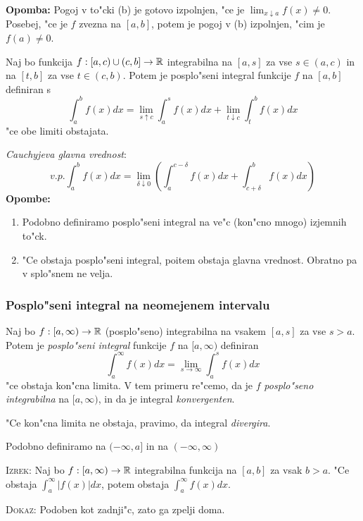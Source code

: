 \textbf{Opomba:} Pogoj v to"cki (b) je gotovo izpolnjen, "ce je $\lim_{x \downarrow a} f(x) \neq 0$. Posebej, "ce je $f$ zvezna na $[a, b]$, potem je pogoj v (b) izpolnjen, "cim je $f(a) \neq 0$.

 Naj bo funkcija $f: [a, c) \cup (c, b] \to \mathbb{R}$ integrabilna na $[a, s]$ za vse $s \in (a, c)$ in na $[t, b]$ za vse $t \in (c, b)$. Potem je posplo"seni integral funkcije $f$ na $[a, b]$ definiran s
\begin{equation*}
\int_a^b f(x) dx = \lim_{s \uparrow c} \int_a^s f(x) dx + \lim_{t \downarrow c} \int_t^b f(x) dx
\end{equation*}
"ce obe limiti obstajata.

\emph{Cauchyjeva glavna vrednost}:
\begin{equation*}
v.p. \int_a^b f(x) dx = \lim_{\delta \downarrow 0} \left( \int_a^{c - \delta} f(x) dx + \int_{c + \delta}^b f(x) dx\right)
\end{equation*}
\textbf{Opombe:}
\begin{enumerate}
	\item Podobno definiramo posplo"seni integral na ve"c (kon"cno mnogo) izjemnih to"ck.
	\item "Ce obstaja posplo"seni integral, poitem obstaja glavna vrednost. Obratno pa v splo"snem ne velja.
\end{enumerate}
%
\subsubsection{Posplo"seni integral na neomejenem intervalu}
 Naj bo $f: [a, \infty) \to \mathbb{R}$ (posplo"seno) integrabilna na vsakem $[a, s]$ za vse $s > a$. Potem je \emph{posplo"seni integral} funkcije $f$ na $[a, \infty)$ definiran
\begin{equation*}
\int_a^\infty f(x) dx = \lim_{s \to \infty} \int_a^s f(x) dx
\end{equation*}
"ce obstaja kon"cna limita. V tem primeru re"cemo, da je $f$ \emph{posplo"seno integrabilna} na $[a, \infty)$, in da je integral \emph{konvergenten}.

"Ce kon"cna limita ne obstaja, pravimo, da integral \emph{divergira}.

Podobno definiramo na $(-\infty, a]$ in na $(-\infty, \infty)$

\textsc{Izrek:} Naj bo $f: [a, \infty) \to \mathbb{R}$ integrabilna funkcija na $[a, b]$ za vsak $b > a$. "Ce obstaja $\int_a^\infty |f(x)| dx$, potem obstaja $\int_a^\infty f(x) dx$.

\textsc{Dokaz:} Podoben kot zadnji"c, zato ga zpelji doma.


